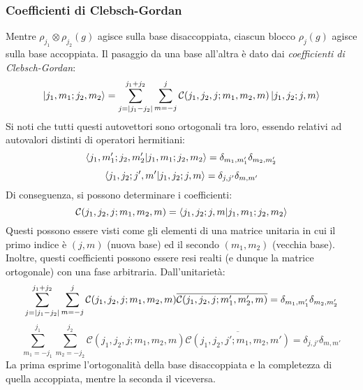 \subsubsection{Coefficienti di Clebsch-Gordan}

Mentre $ \rho_{j_1} \otimes \rho_{j_2}(g) $ agisce sulla base disaccoppiata, ciascun blocco $ \rho_j(g) $ agisce sulla base accoppiata. Il pasaggio da una base all'altra è dato dai \textit{coefficienti di Clebsch-Gordan}:
\begin{equation}
	\ket{j_1,m_1 ; j_2,m_2} = \sum_{j = \left\lvert j_1 - j_2\right\rvert}^{j_1 + j_2} \sum_{m = -j}^{j} \mathcal{C}(j_1,j_2,j ; m_1,m_2,m) \ket{j_1,j_2 ; j,m}
	\label{eq:9.28}
\end{equation}
Si noti che tutti questi autovettori sono ortogonali tra loro, essendo relativi ad autovalori distinti di operatori hermitiani:
\begin{equation}
	\braket{j_1,m'_1 ; j_2,m'_2 | j_1,m_1 ; j_2,m_2} = \delta_{m_1,m'_1} \delta_{m_2,m'_2}
	\label{eq:9.29}
\end{equation}
\begin{equation}
	\braket{j_1,j_2 ; j',m' | j_1,j_2 ; j,m} = \delta_{j,j'} \delta_{m,m'}
	\label{eq:9.30}
\end{equation}
Di conseguenza, si possono determinare i coefficienti:
\begin{equation}
	\mathcal{C}(j_1,j_2,j ; m_1,m_2,m) = \braket{j_1,j_2 ; j,m | j_1,m_1 ; j_2,m_2}
	\label{eq:9.31}
\end{equation}
Questi possono essere visti come gli elementi di una matrice unitaria in cui il primo indice è $ (j,m) $ (nuova base) ed il secondo $ (m_1,m_2) $ (vecchia base). Inoltre, questi coefficienti possono essere resi realti (e dunque la matrice ortogonale) con una fase arbitraria. Dall'unitarietà:
\begin{equation}
	\sum_{j = \left\lvert j_1 - j_2\right\rvert}^{j_1 + j_2} \sum_{m = -j}^{j} \mathcal{C}(j_1,j_2,j ; m_1,m_2,m) \overline{\mathcal{C}(j_1,j_2,j ; m'_1,m'_2,m)} = \delta_{m_1,m'_1} \delta_{m_2,m'_2}
	\label{eq:9.32}
\end{equation}
\begin{equation}
	\sum_{m_1 = -j_1}^{j_1} \sum_{m_2 = -j_2}^{j_2} \mathcal{C}(j_1,j_2,j ; m_1,m_2,m) \overline{\mathcal{C}(j_1,j_2,j' ; m_1,m_2,m')} = \delta_{j,j'} \delta_{m,m'}	
	\label{eq:9.33}
\end{equation}
La prima esprime l'ortogonalità della base disaccoppiata e la completezza di quella accoppiata, mentre la seconda il viceversa.\\
